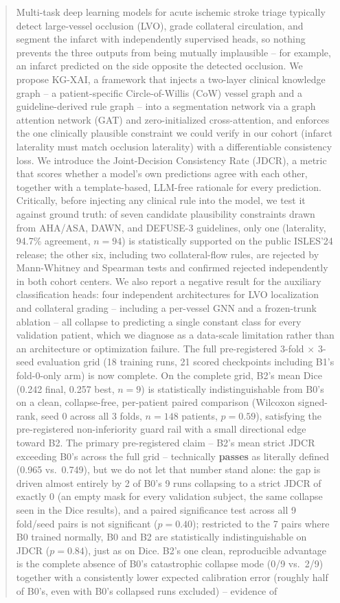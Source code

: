 \documentclass[conference]{IEEEtran}
\begin{document}
\begin{abstract}
Multi-task deep learning models for acute ischemic stroke triage typically detect large-vessel occlusion (LVO), grade collateral circulation, and segment the infarct with independently supervised heads, so nothing prevents the three outputs from being mutually implausible -- for example, an infarct predicted on the side opposite the detected occlusion. We propose KG-XAI, a framework that injects a two-layer clinical knowledge graph -- a patient-specific Circle-of-Willis (CoW) vessel graph and a guideline-derived rule graph -- into a segmentation network via a graph attention network (GAT) and zero-initialized cross-attention, and enforces the one clinically plausible constraint we could verify in our cohort (infarct laterality must match occlusion laterality) with a differentiable consistency loss. We introduce the Joint-Decision Consistency Rate (JDCR), a metric that scores whether a model's own predictions agree with each other, together with a template-based, LLM-free rationale for every prediction. Critically, before injecting any clinical rule into the model, we test it against ground truth: of seven candidate plausibility constraints drawn from AHA/ASA, DAWN, and DEFUSE-3 guidelines, only one (laterality, 94.7\% agreement, $n=94$) is statistically supported on the public ISLES'24 release; the other six, including two collateral-flow rules, are rejected by Mann-Whitney and Spearman tests and confirmed rejected independently in both cohort centers. We also report a negative result for the auxiliary classification heads: four independent architectures for LVO localization and collateral grading -- including a per-vessel GNN and a frozen-trunk ablation -- all collapse to predicting a single constant class for every validation patient, which we diagnose as a data-scale limitation rather than an architecture or optimization failure. The full pre-registered $3$-fold $\times$ $3$-seed evaluation grid (18 training runs, 21 scored checkpoints including B1's fold-0-only arm) is now complete. On the complete grid, B2's mean Dice (0.242 final, 0.257 best, $n=9$) is statistically indistinguishable from B0's on a clean, collapse-free, per-patient paired comparison (Wilcoxon signed-rank, seed 0 across all 3 folds, $n=148$ patients, $p=0.59$), satisfying the pre-registered non-inferiority guard rail with a small directional edge toward B2. The primary pre-registered claim -- B2's mean strict JDCR exceeding B0's across the full grid -- technically \textbf{passes} as literally defined (0.965 vs.\ 0.749), but we do not let that number stand alone: the gap is driven almost entirely by 2 of B0's 9 runs collapsing to a strict JDCR of exactly 0 (an empty mask for every validation subject, the same collapse seen in the Dice results), and a paired significance test across all 9 fold/seed pairs is not significant ($p=0.40$); restricted to the 7 pairs where B0 trained normally, B0 and B2 are statistically indistinguishable on JDCR ($p=0.84$), just as on Dice. B2's one clean, reproducible advantage is the complete absence of B0's catastrophic collapse mode (0/9 vs.\ 2/9) together with a consistently lower expected calibration error (roughly half of B0's, even with B0's collapsed runs excluded) -- evidence of 
\end{abstract}
\end{document}
